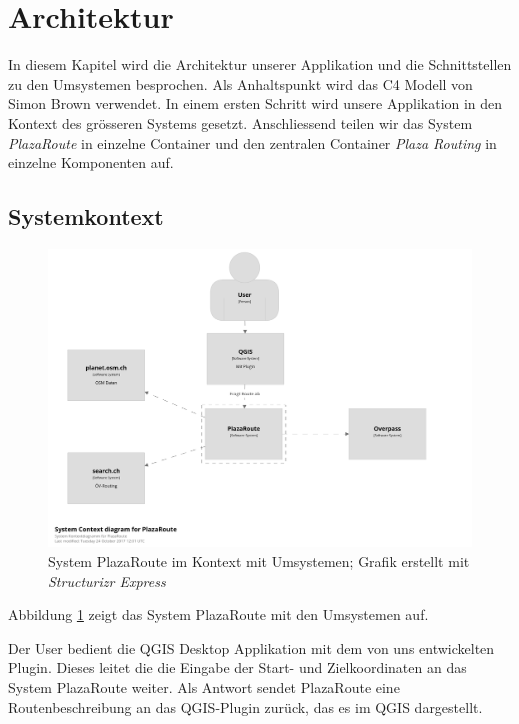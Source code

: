 
\section{Architektur}
\label{sec:Architektur}
In diesem Kapitel wird die Architektur unserer Applikation und die Schnittstellen zu den Umsystemen besprochen. Als Anhaltspunkt wird das C4 Modell \cite{c4model} von Simon Brown verwendet. In einem ersten Schritt wird unsere Applikation in den Kontext des grösseren Systems gesetzt. Anschliessend teilen wir das System \emph{PlazaRoute} in einzelne Container und den zentralen Container \emph{Plaza Routing} in einzelne Komponenten auf.

\subsection{Systemkontext}
\label{architektur:Systemkontext}

\begin{figure}[ht]
\centering
\includegraphics[width=1\linewidth]{projectdoc/img/system-context_diagram.png}
\caption[System Kontext Diagramm]{System PlazaRoute im Kontext mit Umsystemen; Grafik erstellt mit \emph{Structurizr Express}\cite{structurizr}}
\label{fig:system_context_diagram}
\end{figure}

Abbildung \ref{fig:system_context_diagram} zeigt das System PlazaRoute mit den Umsystemen auf.

Der User bedient die QGIS Desktop Applikation mit dem von uns entwickelten Plugin. Dieses leitet die die Eingabe der Start- und Zielkoordinaten an das System PlazaRoute weiter. Als Antwort sendet PlazaRoute eine Routenbeschreibung an das QGIS-Plugin zurück, das es im QGIS dargestellt.

